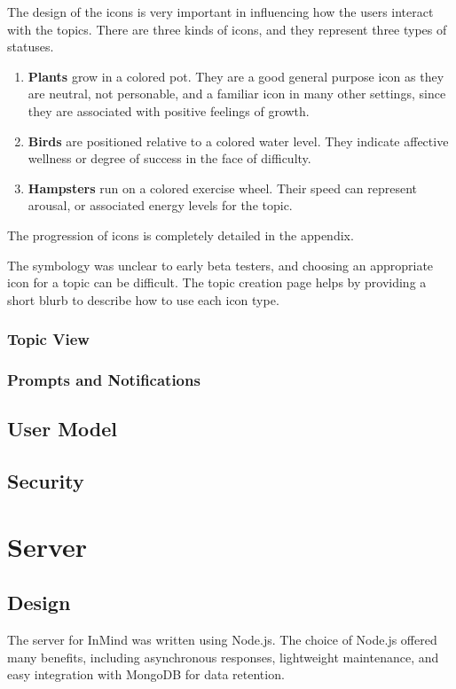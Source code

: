       The design of the icons is very important in influencing how
      the users interact with the topics.
      There are three kinds of icons, and they represent three types of statuses.
      \begin{enumerate}
      \item \textbf{Plants} grow in a colored pot. They are a good general purpose icon as they are neutral,
      not personable, and a familiar icon in many other settings,
      since they are associated with positive feelings of growth.
      \item \textbf{Birds} are positioned relative to a colored water level.
      They indicate affective wellness or degree of success in the face of difficulty.
      \item \textbf{Hampsters} run on a colored exercise wheel.
      Their speed can represent arousal,
      or associated energy levels for the topic.
      \end{enumerate}
      The progression of icons is completely detailed in the appendix.

      The symbology was unclear to early beta testers,
      and choosing an appropriate icon for a topic can be difficult.
      The topic creation page helps by providing
      a short blurb to describe how to use each icon type.

      \subsubsection{Topic View}
      \subsubsection{Prompts and Notifications}

    \subsection{User Model}

    \subsection{Security}


  \section{Server}
    \subsection{Design}
      The server for InMind was written using Node.js.
      The choice of Node.js offered many benefits, including asynchronous responses,
      lightweight maintenance, and easy integration with MongoDB for data retention.

